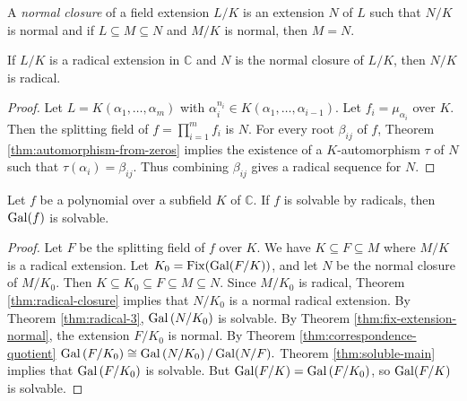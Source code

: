 \begin{definition}
	A \textit{normal closure} of a field extension $L / K$ is an extension $N$ of $L$ such that  $N / K$ is normal and if $L \subseteq M \subseteq N$ and $M / K$ is normal, then $M = N$.
\end{definition}

\begin{theorem} \label{thm:radical-closure}
	If $L / K$ is a radical extension in $\mathbb{C}$ and $N$ is the normal closure of $L / K$, then $N / K$ is radical.
\end{theorem}

\begin{proof}
	Let $L=K\left(\alpha_1, \ldots, \alpha_m\right)$ with $\alpha_i^{n_i} \in K\left(\alpha_1, \ldots, \alpha_{i-1}\right)$. Let $f_i = \mu _ {\alpha_i}$ over $K$. Then the splitting field of $f = \prod_{i=1}^m f_i$ is $N$. For every root $\beta_{i j}$ of $f$,  Theorem \ref{thm:automorphism-from-zeros} implies the existence of a $K$-automorphism $\tau$ of $N$ such that $\tau(\alpha_i) = \beta_{ij}$. Thus combining $\beta_{ij}$ gives a radical sequence for $N$.
\end{proof}





\begin{theorem} \label{thm:radical-galois-soluble}
	Let $f$ be a polynomial over a subfield $K$ of $\mathbb{C}$. If $f$ is solvable by radicals, then $\operatorname{Gal}(f)$ is solvable.
\end{theorem}

\begin{proof}
	Let $F$ be the splitting field of $f$ over $K$. We have $K \subseteq F \subseteq M$ where $M / K$ is a radical extension. Let $K_0 = \operatorname{Fix}(\operatorname{Gal}(F / K))$, and let $N$ be the normal closure of $M / K_0$. Then
	$
	K \subseteq K_0 \subseteq F \subseteq M \subseteq N.
	$
	Since $M / K_0$ is radical, Theorem \ref{thm:radical-closure} implies that $N / K_0$ is a normal radical extension. By Theorem \ref{thm:radical-3}, $\operatorname{Gal}\left(N / K_0\right)$ is solvable.
	By Theorem \ref{thm:fix-extension-normal}, the extension $F / K_0$ is normal. By Theorem \ref{thm:correspondence-quotient}
	$
	\operatorname{Gal}\left(F / K_0\right) \cong \operatorname{Gal}\left(N / K_0\right) / \operatorname{Gal}(N / F).
	$
	Theorem \ref{thm:soluble-main} implies that $\operatorname{Gal}\left(F / K_0\right)$ is solvable. But $\operatorname{Gal}(F / K)=\operatorname{Gal}\left(F / K_0\right)$, so $\operatorname{Gal}(F / K)$ is solvable.
\end{proof}


